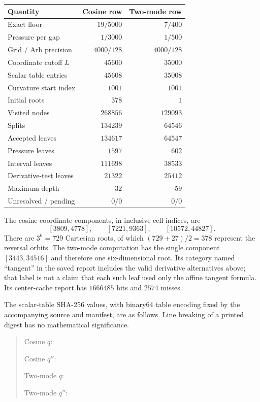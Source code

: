 \documentclass[11pt]{amsart}
\numberwithin{equation}{section}
\begin{document}
\begin{center}\small
\begin{tabular}{@{}lrr@{}}
\toprule
Quantity & Cosine row & Two-mode row\\
\midrule
Exact floor & $19/5000$ & $7/400$\\
Pressure per gap & $1/3000$ & $1/500$\\
Grid / Arb precision & $4000/128$ & $4000/128$\\
Coordinate cutoff $L$ & $45600$ & $35000$\\
Scalar table entries & $45608$ & $35008$\\
Curvature start index & $1001$ & $1001$\\
Initial roots & $378$ & $1$\\
Visited nodes & $268856$ & $129093$\\
Splits & $134239$ & $64546$\\
Accepted leaves & $134617$ & $64547$\\
Pressure leaves & $1597$ & $602$\\
Interval leaves & $111698$ & $38533$\\
Derivative-test leaves & $21322$ & $25412$\\
Maximum depth & $32$ & $59$\\
Unresolved / pending & $0/0$ & $0/0$\\
\bottomrule
\end{tabular}
\end{center}

The cosine coordinate components, in inclusive cell indices, are
\begin{equation}\label{eq:Ccomponents}
 [3809,4778],\qquad[7221,9363],\qquad[10572,44827].
\end{equation}
There are $3^6=729$ Cartesian roots, of which
$(729+27)/2=378$ represent the reversal orbits. The
two-mode computation has the single component $[3443,34516]$ and
therefore one six-dimensional root. Its category named ``tangent''
in the saved report includes the valid derivative alternatives above;
that label is not a claim that each such leaf used only the affine
tangent formula. Its center-cache report has $1666485$ hits and $2574$
misses.

The scalar-table SHA-256 values, with binary64 table encoding fixed
by the accompanying source and manifest, are as follows. Line breaking
of a printed digest has no mathematical significance.
\begin{quote}\footnotesize
Cosine $q$:

Cosine $q''$:

Two-mode $q$:

Two-mode $q''$:
\end{quote}
\end{document}
